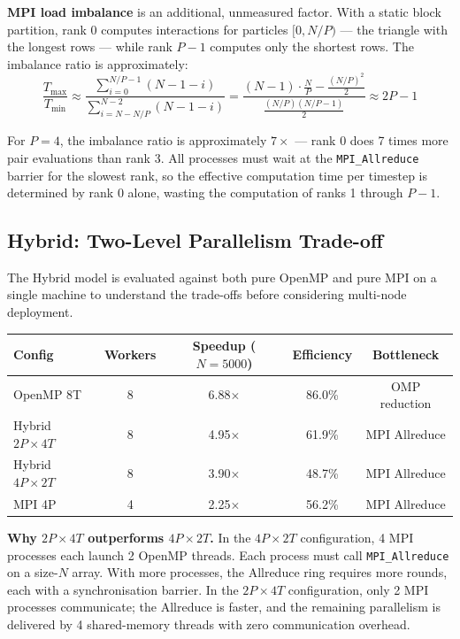 ﻿\documentclass[12pt,a4paper]{article}
\begin{document}
\textbf{MPI load imbalance} is an additional, unmeasured factor.
With a static block partition, rank 0 computes interactions for particles
$[0, N/P)$ --- the triangle with the longest rows --- while rank $P-1$
computes only the shortest rows. The imbalance ratio is approximately:
\begin{equation}
    \frac{T_{\max}}{T_{\min}} \approx
    \frac{\sum_{i=0}^{N/P-1}(N-1-i)}{\sum_{i=N-N/P}^{N-2}(N-1-i)}
    = \frac{(N-1)\cdot\frac{N}{P} - \frac{(N/P)^2}{2}}
           {\frac{(N/P)(N/P-1)}{2}}
    \approx 2P - 1
\end{equation}

For $P=4$, the imbalance ratio is approximately $7\times$ --- rank 0
does 7 times more pair evaluations than rank 3. All processes must wait
at the \texttt{MPI\_Allreduce} barrier for the slowest rank, so the
effective computation time per timestep is determined by rank 0 alone,
wasting the computation of ranks 1 through $P-1$.

\subsection{Hybrid: Two-Level Parallelism Trade-off}

The Hybrid model is evaluated against both pure OpenMP and pure MPI on a
single machine to understand the trade-offs before considering multi-node
deployment.

\begin{center}
\begin{tabular}{lcccc}
    \toprule
    \textbf{Config} & \textbf{Workers} & \textbf{Speedup ($N=5000$)}
        & \textbf{Efficiency} & \textbf{Bottleneck} \\
    \midrule
    OpenMP 8T           & 8 & 6.88$\times$ & 86.0\% & OMP reduction \\
    Hybrid $2P\times4T$ & 8 & 4.95$\times$ & 61.9\% & MPI Allreduce \\
    Hybrid $4P\times2T$ & 8 & 3.90$\times$ & 48.7\% & MPI Allreduce \\
    MPI 4P              & 4 & 2.25$\times$ & 56.2\% & MPI Allreduce \\
    \bottomrule
\end{tabular}
\end{center}

\textbf{Why $2P\times4T$ outperforms $4P\times2T$.}
In the $4P\times2T$ configuration, 4 MPI processes each launch 2 OpenMP
threads. Each process must call \texttt{MPI\_Allreduce} on a size-$N$ array.
With more processes, the Allreduce ring requires more rounds, each with a
synchronisation barrier. In the $2P\times4T$ configuration, only 2 MPI
processes communicate; the Allreduce is faster, and the remaining parallelism
is delivered by 4 shared-memory threads with zero communication overhead.
\end{document}
